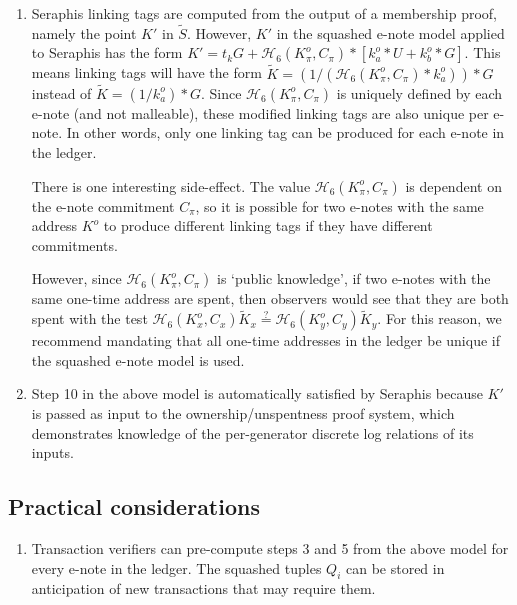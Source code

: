 \begin{appendices}
\begin{enumerate}
\begin{enumerate}
        [[[formal proof? this is giving me a lot of trouble]]]
    \end{enumerate}

    \item Seraphis linking tags are computed from the output of a membership proof, namely the point $K'$ in $\tilde{S}$. However, $K'$ in the squashed e-note model applied to Seraphis has the form $K' = t_k G + \mathcal{H}_6(K^o_{\pi}, C_{\pi})*[k^o_a*U + k^o_b*G]$. This means linking tags will have the form $\tilde{K} = (1/(\mathcal{H}_6(K^o_{\pi}, C_{\pi})*k^o_a))*G$ instead of $\tilde{K} = (1/k^o_a)*G$. Since $\mathcal{H}_6(K^o_{\pi}, C_{\pi})$ is uniquely defined by each e-note (and not malleable), these modified linking tags are also unique per e-note. In other words, only one linking tag can be produced for each e-note in the ledger.

    There is one interesting side-effect. The value $\mathcal{H}_6(K^o_{\pi}, C_{\pi})$ is dependent on the e-note commitment $C_{\pi}$, so it is possible for two e-notes with the same address $K^o$ to produce different linking tags if they have different commitments.

    However, since $\mathcal{H}_6(K^o_{\pi}, C_{\pi})$ is `public knowledge', if two e-notes with the same one-time address are spent, then observers would see that they are both spent with the test $\mathcal{H}_6(K^o_{x}, C_{x})\tilde{K}_x \stackrel{?}{=} \mathcal{H}_6(K^o_{y}, C_{y})\tilde{K}_y$. For this reason, we recommend mandating that all one-time addresses in the ledger be unique if the squashed e-note model is used.

    \item Step 10 in the above model is automatically satisfied by Seraphis because $K'$ is passed as input to the ownership/unspentness proof system, which demonstrates knowledge of the per-generator discrete log relations of its inputs.
\end{enumerate}


\subsection{Practical considerations}
\label{appendix:squashed-e-note-model-practical-considerations}

\begin{enumerate}
    \item Transaction verifiers can pre-compute steps 3 and 5 from the above model for every e-note in the ledger. The squashed tuples $Q_i$ can be stored in anticipation of new transactions that may require them.


\end{enumerate}
\end{appendices}
